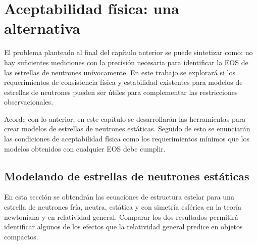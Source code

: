 \chapter{Aceptabilidad física: una alternativa}

\noindent El problema planteado al final del capítulo anterior se puede sintetizar como: no hay suficientes mediciones con la precisión necesaria para identificar la EOS de las estrellas de neutrones unívocamente. En este trabajo se explorará si los requerimientos de consistencia física y estabilidad existentes para modelos de estrellas de neutrones pueden ser útiles para complementar las restricciones observacionales.

Acorde con lo anterior, en este capítulo se desarrollarán las herramientas para crear modelos de estrellas de neutrones estáticas. Seguido de esto se enunciarán las condiciones de aceptabilidad física como los requerimientos mínimos que los modelos obtenidos con cualquier EOS debe cumplir.



\section{Modelando de estrellas de neutrones estáticas}

\noindent En esta sección se obtendrán las ecuaciones de estructura estelar para una estrella de neutrones fría, neutra, estática y con simetría esférica en la teoría newtoniana y en relatividad general. Comparar los dos resultados permitirá identificar algunos de los efectos que la relatividad general predice en objetos compactos.

